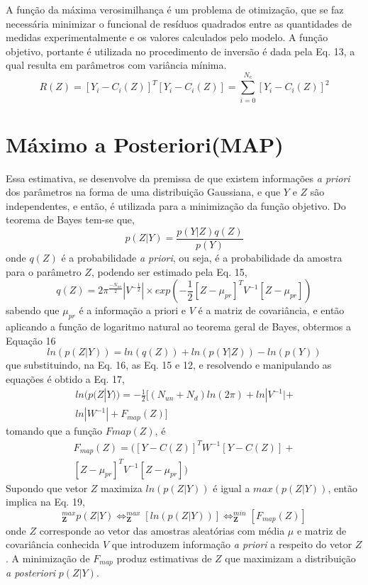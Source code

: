 \documentclass[por]{Template_SBEF}
\begin{document}
A função da máxima verosimilhança é um problema de otimização, que se faz necessária minimizar o funcional de resíduos quadrados entre as quantidades de medidas experimentalmente e os valores calculados pelo modelo. A função objetivo, portante é utilizada no procedimento de inversão é dada pela Eq. 13, a qual resulta em parâmetros com variância mínima.
\begin{equation}
R(Z) = [Y_i - C_i(Z)]^T [Y_i - C_i (Z)] = \sum_{i=0}^{N_c}[Y_i - C_i(Z)]^2
\end{equation}
\section{Máximo a Posteriori(MAP)}
Essa estimativa, se desenvolve da premissa de que existem informações \textit{a priori} dos parâmetros na forma de uma distribuição Gaussiana, e que $Y$ e $Z$ são independentes, e então, é utilizada para a minimização da função objetivo. Do teorema de Bayes tem-se que,
\begin{equation}
p(Z|Y)= \frac{p(Y|Z)q(Z)}{p(Y)}
\end{equation}
onde $q(Z)$ é a probabilidade \textit{a priori}, ou seja, é a probabilidade da amostra para o parâmetro $Z$, podendo ser estimado pela Eq. 15,
\begin{equation}
q(Z)=2\pi^{\frac{-N_{un}}{2}}|V^{-\frac{1}{2}}| \times exp(-\frac{1}{2}[Z-\mu_{pr}]^T V^{-1}[Z-\mu_{pr}])
\end{equation} 
sabendo que $\mu_{pr}$ é a informação a priori e $V$ é a matriz de covariância, e então aplicando a função de logaritmo natural ao teorema geral de Bayes, obtermos a Equação 16
\begin{equation}
ln(p(Z|Y))=ln(q(Z))+ln(p(Y|Z))-ln(p(Y))
\end{equation}
que substituindo, na Eq. 16, as Eq. 15 e 12, e resolvendo e manipulando as equações é obtido a Eq. 17,
\begin{equation}
\begin{split}
ln(p(Z|Y)) = -\frac{1}{2}[(N_{un}+N_d)ln(2\pi)+ln|V^{-1}|+\\
ln|W^{-1}|+F_{map}(Z)]
\end{split}
\end{equation} 
tomando que a função $F{map}(Z)$, é
\vspace{10pt}
\begin{equation}
\begin{split}
F_{map}(Z)=([Y-C(Z)]^TW^{-1}[Y-C(Z)]+\\
[Z- \mu_{pr}]^T V^{-1}[Z-\mu_{pr}])
\end{split}
\end{equation}
Supondo que vetor $Z$ maximiza $ln(p(Z|Y))$ é igual a $max(p(Z|Y))$, então implica na Eq. 19,
\begin{equation}
_\mathbf{Z}^{max} p(Z|Y) \Leftrightarrow _\mathbf{Z}^{max} [ln(p(Z|Y))] \Leftrightarrow _\mathbf{Z}^{min} [F_{map}(Z)]
\end{equation}
onde $Z$ corresponde ao vetor das amostras aleatórias com média $\mu$ e matriz de covariância conhecida $V$ que introduzem informação \textit{a priori} a respeito do vetor $Z$. A minimização de $F_{map}$ produz estimativas de $Z$ que maximizam a distribuição \textit{a posteriori} $p(Z|Y)$.
\end{document}
